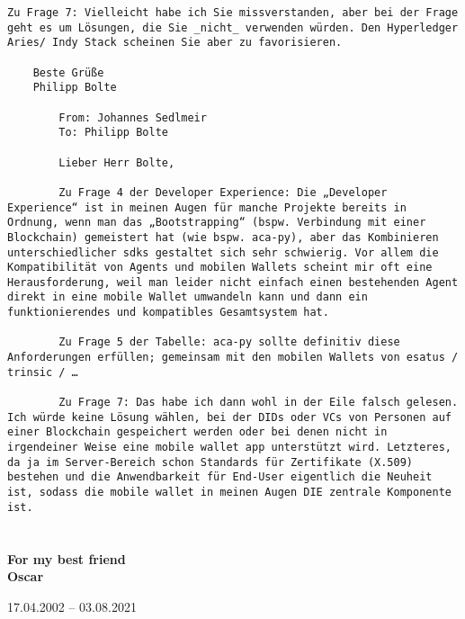 \begin{Verbatim}[breaklines=true, breaksymbol={}, breaksymbolsepleftnchars=2]
    Zu Frage 7: Vielleicht habe ich Sie missverstanden, aber bei der Frage geht es um Lösungen, die Sie _nicht_ verwenden würden. Den Hyperledger Aries/ Indy Stack scheinen Sie aber zu favorisieren. 
    
    Beste Grüße
    Philipp Bolte
    
        From: Johannes Sedlmeir
        To: Philipp Bolte
        
        Lieber Herr Bolte,
 
        Zu Frage 4 der Developer Experience: Die „Developer Experience“ ist in meinen Augen für manche Projekte bereits in Ordnung, wenn man das „Bootstrapping“ (bspw. Verbindung mit einer Blockchain) gemeistert hat (wie bspw. aca-py), aber das Kombinieren unterschiedlicher sdks gestaltet sich sehr schwierig. Vor allem die Kompatibilität von Agents und mobilen Wallets scheint mir oft eine Herausforderung, weil man leider nicht einfach einen bestehenden Agent direkt in eine mobile Wallet umwandeln kann und dann ein funktionierendes und kompatibles Gesamtsystem hat.
 
        Zu Frage 5 der Tabelle: aca-py sollte definitiv diese Anforderungen erfüllen; gemeinsam mit den mobilen Wallets von esatus / trinsic / …
         
        Zu Frage 7: Das habe ich dann wohl in der Eile falsch gelesen. Ich würde keine Lösung wählen, bei der DIDs oder VCs von Personen auf einer Blockchain gespeichert werden oder bei denen nicht in irgendeiner Weise eine mobile wallet app unterstützt wird. Letzteres, da ja im Server-Bereich schon Standards für Zertifikate (X.509) bestehen und die Anwendbarkeit für End-User eigentlich die Neuheit ist, sodass die mobile wallet in meinen Augen DIE zentrale Komponente ist.
\end{Verbatim}
\newpage
\chapter*{}\label{chapter: appendix}
\markboth{}{}
\thispagestyle{empty}
\vspace{3cm}
\begin{center}
    \textbf{For my best friend}\\
    \textbf{Oscar}
    
    \vspace{1cm}
    17.04.2002 – 03.08.2021
\end{center}
\vfill

